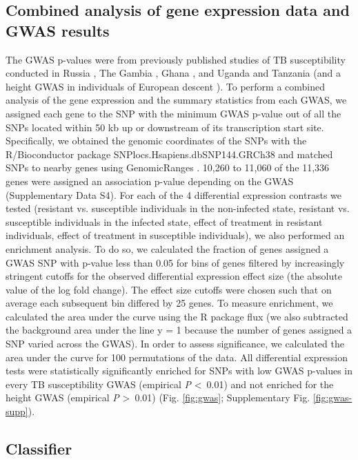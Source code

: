 \documentclass[fleqn,10pt]{wlscirep}
\begin{document}
\subsection*{Combined analysis of gene expression data and GWAS results}

The GWAS p-values were from previously published studies of TB
susceptibility conducted in Russia \cite{Curtis2015}, The Gambia
\cite{Thye2010}, Ghana \cite{Thye2010}, and Uganda and Tanzania
\cite{Sobota2016} (and a height GWAS in individuals of European
descent \cite{LangoAllen2010}). To perform a combined analysis of the
gene expression and the summary statistics from each GWAS, we assigned
each gene to the SNP with the minimum GWAS p-value out of all the SNPs
located within 50 kb up or downstream of its transcription start site.
Specifically, we obtained the genomic coordinates of the SNPs with the
R/Bioconductor \cite{Huber2015} package
SNPlocs.Hsapiens.dbSNP144.GRCh38 and matched SNPs to nearby genes
using GenomicRanges \cite{Lawrence2013}. 10,260 to 11,060 of the
11,336 genes were assigned an association p-value depending on the
GWAS (Supplementary Data S4). For each of the 4 differential
expression contrasts we tested (resistant vs. susceptible individuals
in the non-infected state, resistant vs. susceptible individuals in
the infected state, effect of treatment in resistant individuals,
effect of treatment in susceptible individuals), we also performed an
enrichment analysis. To do so, we calculated the fraction of genes
assigned a GWAS SNP with p-value less than 0.05 for bins of genes
filtered by increasingly stringent cutoffs for the observed
differential expression effect size (the absolute value of the log
fold change). The effect size cutoffs were chosen such that on average
each subsequent bin differed by 25 genes. To measure enrichment, we
calculated the area under the curve using the R package flux
\cite{Jurasinski2014} (we also subtracted the background area under
the line y = 1 because the number of genes assigned a SNP varied
across the GWAS). In order to assess significance, we calculated the
area under the curve for 100 permutations of the data. All
differential expression tests were statistically significantly
enriched for SNPs with low GWAS p-values in every TB susceptibility
GWAS (empirical \emph{P} \textless \, 0.01) and not enriched for the
height GWAS (empirical \emph{P} \textgreater \, 0.01) (Fig.
\ref{fig:gwas}; Supplementary Fig. \ref{fig:gwas-supp}).
\subsection*{Classifier}
\end{document}
